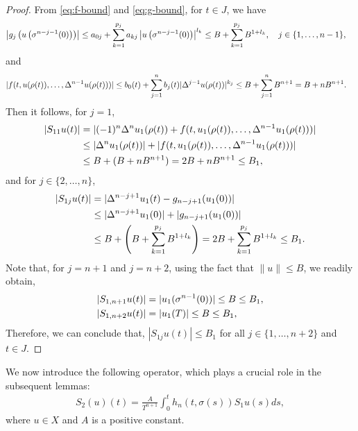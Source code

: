 \documentclass[reqno, 12pt]{amsart}
\numberwithin{equation}{section}
\begin{document}
\begin{proof}
From \eqref{eq:f-bound} and \eqref{eq:g-bound}, for $ t \in J$, we have
\begin{align}
\left|g_j\left(u\left(\sigma^{n-j-1}(0)\right)\right)\right| &\leq a_{0j} + \sum_{k=1}^{p_j} a_{kj}\left|u\left(\sigma^{n-j-1}(0)\right)\right|^{l_k} \notag
\leq B + \sum_{k=1}^{p_j} B^{1+l_k}, \quad j \in \{1, \ldots, n-1\}, \notag
\end{align}
and
\begin{align}
|f(t, u(\rho(t)), \ldots, \Delta^{n-1}u(\rho(t)))| &\leq b_0(t) + \sum_{j=1}^{n} b_j(t)|\Delta^{j-1}u(\rho(t))|^{k_j} \notag \leq B + \sum_{j=1}^{n} B^{n+1} = B + nB^{n+1}. \notag
\end{align}
Then it follows, for $j=1$,
\begin{align}
|S_{11}u(t)| &= |(-1)^n\Delta^n u_1(\rho(t)) + f(t, u_1(\rho(t)), \ldots, \Delta^{n-1}u_1(\rho(t)))| \notag\\
&\leq |\Delta^n u_1(\rho(t))| + |f(t, u_1(\rho(t)), \ldots, \Delta^{n-1}u_1(\rho(t)))| \notag\\
&\leq B + (B + nB^{n+1}) = 2B + nB^{n+1} \leq B_1, \notag
\end{align}
and for $j \in \{2, \ldots, n\}$, 
\begin{align}
|S_{1j}u(t)| &= |\Delta^{n-j+1}u_1(t) - g_{n-j+1}(u_1(0))| \notag\\
&\leq |\Delta^{n-j+1}u_1(0)| + |g_{n-j+1}(u_1(0))| \notag\\
&\leq B + \left(B + \sum_{k=1}^{p_j} B^{1+l_k}\right) = 2B + \sum_{k=1}^{p_j} B^{1+l_k} \leq B_1. \notag
\end{align}
Note that, for $j=n+1$ and $j=n+2$, using the fact that $\|u\| \le B$, we readily obtain,
\begin{align}
|S_{1,n+1}u(t)| &= |u_1(\sigma^{n-1}(0))| \leq B \leq B_1, \notag\\
|S_{1,n+2}u(t)| &= |u_1(T)| \leq B \leq B_1, \notag
\end{align}
Therefore, we can conclude that, $|S_{1j}u(t)| \leq B_1$ for all $j \in \{1, \ldots, n+2\}$ and $t \in J$.
\end{proof}

We now introduce the following operator, which plays a crucial role in the subsequent lemmas:
\begin{align}
S_2(u)(t) = \frac{A}{T^{n+1}} \int_0^t h_n(t, \sigma(s))S_1u(s)ds, \label{eq:S2-def}
\end{align}
where $u \in X$ and $A$ is a positive constant.
\end{document}
